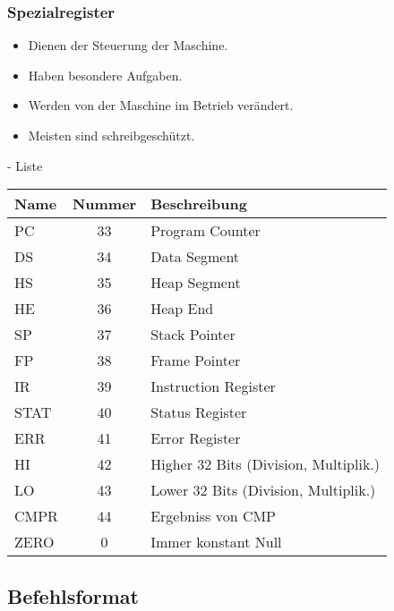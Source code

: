 \subsubsection{Spezialregister}

\begin{frame}{\insertsubsubsection}
 \begin{itemize}
   \item Dienen der Steuerung der Maschine.
   \item Haben besondere Aufgaben.
   \item Werden von der Maschine im Betrieb verändert.
   \item Meisten sind schreibgeschützt.
 \end{itemize}
\end{frame}



\begin{frame}{\insertsubsubsection{} - Liste}
 \begin{tabular}{lcl}
Name  & Nummer & Beschreibung                \\\toprule
PC    & 33     & Program Counter             \\ 
DS    & 34     & Data Segment                \\ 
HS    & 35     & Heap Segment                \\ 
HE    & 36     & Heap End                    \\ 
SP    & 37     & Stack Pointer               \\
FP    & 38     & Frame Pointer               \\
IR    & 39     & Instruction Register        \\
STAT  & 40     & Status Register             \\
ERR   & 41     & Error Register              \\
HI    & 42     & Higher 32 Bits (Division, Multiplik.) \\
LO    & 43     & Lower 32 Bits (Division, Multiplik.)  \\
CMPR  & 44     & Ergebniss von CMP           \\
ZERO  & 0      & Immer konstant Null         \\\bottomrule
 \end{tabular}
\end{frame}



\subsection{Befehlsformat}

